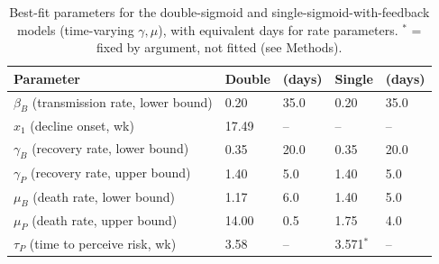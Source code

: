 \begin{table}[t]
    \centering
    \small
    \caption{Best-fit parameters for the double-sigmoid and single-sigmoid-with-feedback models (time-varying $\gamma,\mu$), with equivalent days for rate parameters. $^*$ = fixed by argument, not fitted (see Methods).}
    \begin{tabular}{@{\hskip 3pt}p{2.4cm}@{\hskip 6pt}p{1.6cm}@{\hskip 1pt}p{1.3cm}@{\hskip 10pt}p{1.6cm}@{\hskip 1pt}p{1.3cm}}
        \toprule
        \textbf{Parameter} & \textbf{Double} & \textbf{(days)} & \textbf{Single} & \textbf{(days)} \\
        \midrule
        $\beta_B$ (transmission rate, lower bound) & 0.20 & 35.0 & 0.20 & 35.0 \\
        $x_1$ (decline onset, wk) & 17.49 & -- & -- & -- \\
        $\gamma_B$ (recovery rate, lower bound) & 0.35 & 20.0 & 0.35 & 20.0 \\
        $\gamma_P$ (recovery rate, upper bound) & 1.40 & 5.0 & 1.40 & 5.0 \\
        $\mu_B$ (death rate, lower bound) & 1.17 & 6.0 & 1.40 & 5.0 \\
        $\mu_P$ (death rate, upper bound) & 14.00 & 0.5 & 1.75 & 4.0 \\
        $\tau_P$ (time to perceive risk, wk) & 3.58 & -- & 3.571$^*$ & -- \\
        \bottomrule
    \end{tabular}
    \label{tab:main_params}
\end{table}